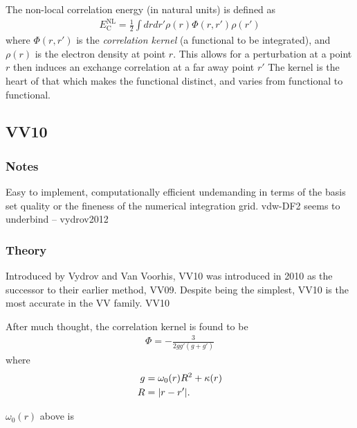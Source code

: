 \documentclass[10pt,a4paper,twocolumn,twoside]{extarticle}
\begin{document}
	The non-local correlation energy (in natural units) is defined as 
	\begin{align}
		E^\text{NL}_\text{C} = \frac{1}{2} \int dr dr' \rho(r) \Phi(r, r') \rho(r')
	\end{align}
	where $\Phi(r, r')$ is the \emph{correlation kernel} (a functional to be integrated), and $\rho(r)$ is the electron density at point $r$. This allows for a perturbation at a point $r$ then induces an exchange correlation at a far away point $r'$
	\color{red} The kernel is the heart of that which makes the functional distinct, and varies from functional to functional.\color{black}

	\subsection{VV10}
	\subsubsection*{Notes}
	Easy to implement, computationally efficient undemanding in terms of the basis set quality or
	the fineness of the numerical integration grid. vdw-DF2 seems to underbind -- vydrov2012
	\subsubsection{Theory}
	Introduced by Vydrov and Van Voorhis, VV10 was introduced in 2010 as the successor to their earlier method, VV09.\cite{VV09Original-Vydrov2009}\cite{Vydrov2010} 
	Despite being the simplest, VV10 is the most accurate in the VV family.\cite{Grimme2011} 
	VV10 

	After much thought, the correlation kernel is found to be  
	\begin{align}
		\Phi = - \frac{3}{2gg'(g+g')}
	\end{align}
	where 
	\begin{align}
		g &= \omega_0(r)R^2 + \kappa(r)\\
		R &= \absolutevalue{r - r'}.
	\end{align}
	
	$\omega_0(r)$ above is 
\end{document}
